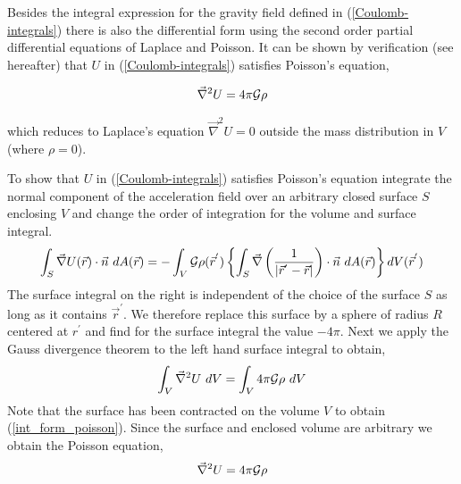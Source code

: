 \vspace{.4cm}

Besides the integral expression for the gravity field defined in
(\ref{Coulomb-integrals}) there is also the differential form
using the second order partial differential equations of Laplace and
Poisson.
It can be shown by verification (see hereafter) that $U$ in (\ref{Coulomb-integrals})
satisfies Poisson's equation, 
\begin{mdframed}[backgroundcolor=blue!5]
\begin{equation}
\vec\nabla^2 U = 4\pi {\cal G}\rho  \label{poisson_eqn}
\end{equation}
\end{mdframed}
which reduces to Laplace's equation $\vec\nabla^2 U = 0$
outside the mass distribution in $V$ (where $\rho =0$). 

To show that $U$ in (\ref{Coulomb-integrals}) satisfies Poisson's
equation integrate the normal component of the acceleration field
over an arbitrary closed surface $S$ enclosing $V$
and change the order of integration for the volume and surface
integral.
\begin{equation}
\int_S \vec\nabla U({\vec r}) \cdot {\vec n} \ dA({\vec r})
   = - \int_V {\cal G} \rho({\vec r}^{'}) 
    \left \{
     \int_S 
       \vec\nabla 
       \left ( \frac{1}{\left | {\vec r}^{'}-{\vec r} \right |} \right )
      \cdot {\vec n} \ dA({\vec r}) 
    \right \} dV({\vec r}^{'})
\label{surface_integral}
\end{equation}
The surface integral on the right is independent of the choice of the
surface $S$ as long as it contains ${\vec r}^{'}$.
We therefore replace this surface by a sphere of radius $R$ centered
at $r^{'}$ and find for the surface integral the value $- 4 \pi$.
\newline
Next we apply the Gauss divergence theorem to the left hand surface 
integral to obtain,
\begin{equation}
\int_V \vec\nabla^2 U \ dV = \int_V 4 \pi {\cal G} \rho \ dV  
\label{int_form_poisson}
\end{equation}
Note that the surface has been contracted on the volume $V$
to obtain (\ref{int_form_poisson}).
Since the surface and enclosed volume are arbitrary we obtain the Poisson
equation,
\begin{equation}
\vec\nabla^2 U  = 4 \pi {\cal G} \rho 
\end{equation}


\vspace{.4cm}

